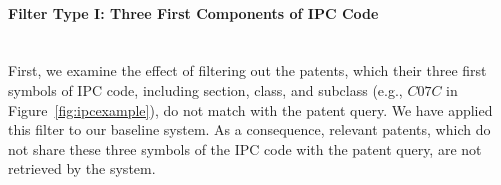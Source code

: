 \paragraph{Filter Type I: Three First Components of IPC Code}
\ \\
First, we examine the effect of filtering out the patents, which their three first symbols of IPC code, including section, class, and subclass (e.g., $\mathit{C07C}$ in Figure~\ref{fig:ipcexample}), do not match with the patent query. We have applied this filter to our baseline system. As a consequence, relevant patents, which do not share these three symbols of the IPC code with the patent query, are not retrieved by the system.   

